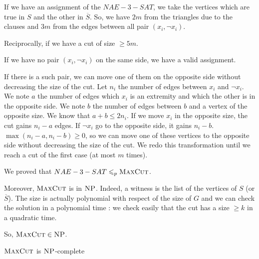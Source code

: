 If we have an assignment of the $NAE-3-SAT$, we take the vertices which are true in $S$ and the other in $\overline{S}$. So, we have $2m$ from the triangles due to the clauses and $3m$ from the edges between all pair $(x_i,\neg x_i)$.

Reciprocally, if we have a cut of size $\geqslant 5m$.

If we have no pair $(x_i, \neg x_i)$ on the same side, we have a valid assignment.

If there is a such pair, we can move one of them on the opposite side without decreasing the size of the cut. Let $n_i$ the number of edges between $x_i$ and $\neg x_i$. We note $a$ the number of edges which $x_i$ is an extremity and which the other is in the opposite side. We note $b$ the number of edges between $b$ and a vertex of the opposite size. We know that $a+b \leqslant 2n_i$. If we move $x_i$ in the opposite size, the cut gains $n_i-a$ edges. If $\neg x_i$ go to the opposite side, it gains $n_i-b$. $\max(n_i-a,n_i-b)\geqslant 0$, so we can move one of these vertices to the opposite side without decreasing the size of the cut. We redo this transformation until we reach a cut of the first case (at most $m$ times).

We proved that $NAE-3-SAT \leqslant_p \textsc{MaxCut}$.

Moreover, $\textsc{MaxCut}$ is in $\textsc{NP}$. Indeed, a witness is the list of the vertices of $S$ (or $\overline{S}$). The size is actually polynomial with respect of the size of $G$ and we can check the solution in a polynomial time : we check easily that the cut has a size $\geqslant k$ in a quadratic time.

So, $\textsc{MaxCut}\in\textsc{NP}$.

\begin{theorem}
    $\textsc{MaxCut}$ is $\textsc{NP}$-complete
\end{theorem}
   

